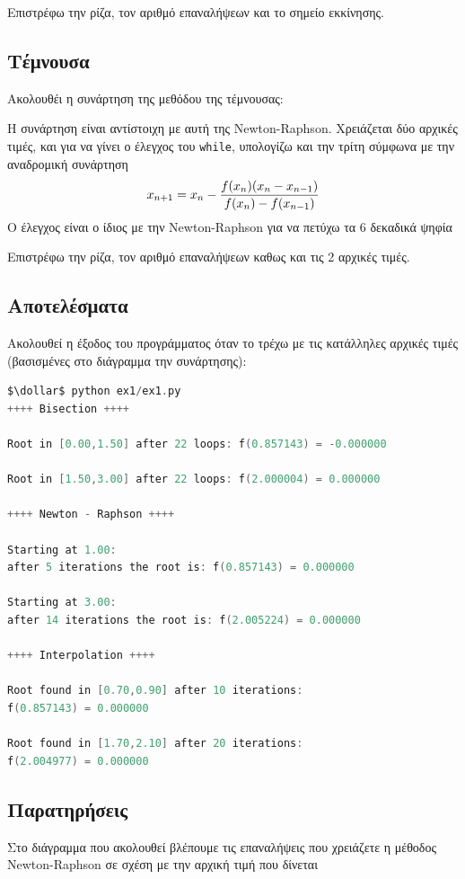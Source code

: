 Επιστρέφω την ρίζα, τον αριθμό επαναλήψεων και το σημείο εκκίνησης.

\subsection{Τέμνουσα}
Ακολουθέι η συνάρτηση της μεθόδου της τέμνουσας:


Η συνάρτηση είναι αντίστοιχη με αυτή της Newton-Raphson.
Χρειάζεται δύο αρχικές τιμές, και για να γίνει ο έλεγχος του \texttt{while},
υπολογίζω και την τρίτη σύμφωνα με την αναδρομική συνάρτηση
$$x_{n+1} = x_n - {{f(x_n)(x_n - x_{n-1})} \over {f(x_n) - f(x_{n-1})}}$$
Ο έλεγχος είναι ο ίδιος με την Newton-Raphson για να πετύχω τα
6 δεκαδικά ψηφία

Επιστρέφω την ρίζα, τον αριθμό επαναλήψεων καθως και τις 2 αρχικές τιμές.

\subsection{Αποτελέσματα}
Ακολουθεί η έξοδος του προγράμματος όταν το τρέχω με τις
κατάλληλες αρχικές τιμές (βασισμένες στο διάγραμμα την συνάρτησης):

\begin{lstlisting}[language=C, mathescape=true]
$\dollar$ python ex1/ex1.py
++++ Bisection ++++

Root in [0.00,1.50] after 22 loops: f(0.857143) = -0.000000

Root in [1.50,3.00] after 22 loops: f(2.000004) = 0.000000

++++ Newton - Raphson ++++

Starting at 1.00:
after 5 iterations the root is: f(0.857143) = 0.000000

Starting at 3.00:
after 14 iterations the root is: f(2.005224) = 0.000000

++++ Interpolation ++++

Root found in [0.70,0.90] after 10 iterations:
f(0.857143) = 0.000000

Root found in [1.70,2.10] after 20 iterations:
f(2.004977) = 0.000000
\end{lstlisting}

\newpage
\subsection{Παρατηρήσεις}
Στο διάγραμμα που ακολουθεί βλέπουμε τις επαναλήψεις που
χρειάζετε η μέθοδος Newton-Raphson σε σχέση με την αρχική τιμή
που δίνεται

